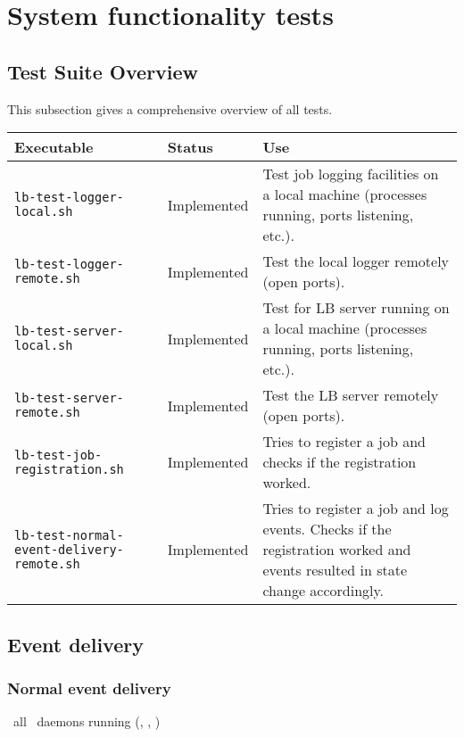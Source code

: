 
\section{System functionality tests}
\label{s:functionality}

\subsection{Test Suite Overview}

This subsection gives a comprehensive overview of all tests.

\begin{tabularx}{\textwidth}{|l|l|X|}
\hline
     {\bf Executable} & {\bf Status} & {\bf Use} \\
\hline
{\tt lb-test-logger-local.sh} & Implemented & Test job logging facilities on a local machine (processes running, ports listening, etc.). \\
\hline
{\tt lb-test-logger-remote.sh} & Implemented & Test the local logger remotely (open ports). \\
\hline
{\tt lb-test-server-local.sh} & Implemented & Test for LB server running on a local machine (processes running, ports listening, etc.). \\
\hline
{\tt lb-test-server-remote.sh} & Implemented & Test the LB server remotely (open ports). \\
\hline
{\tt lb-test-job-registration.sh} & Implemented & Tries to register a job and checks if the registration worked. \\
\hline
{\tt lb-test-normal-event-delivery-remote.sh} & Implemented & Tries to register a job and log events. Checks if the registration worked and events resulted in state change accordingly. \\
\hline
\end{tabularx}


\subsection{Event delivery}

\subsubsection{Normal event delivery}
\label{normal}

\req\ all \LB\ daemons running (, ,
)

